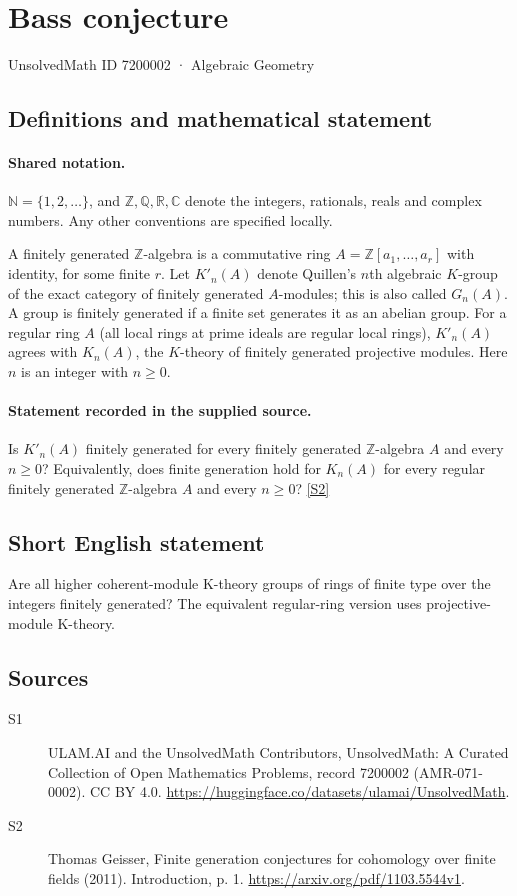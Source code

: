 \documentclass[11pt]{article}
\newcommand{\sref}[2]{\hyperlink{source:#1:#2}{[S#2]}}
\begin{document}
\setcounter{section}{7200001}
\section{Bass conjecture}\label{7200002}
{\small\sffamily UnsolvedMath ID 7200002 · Algebraic Geometry}
\subsection{Definitions and mathematical statement}

\paragraph{Shared notation.}$\mathbb N=\{1,2,\ldots\}$, and $\mathbb Z,\mathbb Q,\mathbb R,\mathbb C$ denote the integers, rationals, reals and complex numbers. Any other conventions are specified locally.


A finitely generated $\mathbb Z$-algebra is a commutative ring $A=\mathbb Z[a_1,\ldots,a_r]$ with identity, for some finite $r$. Let $K'_n(A)$ denote Quillen's $n$th algebraic $K$-group of the exact category of finitely generated $A$-modules; this is also called $G_n(A)$. A group is finitely generated if a finite set generates it as an abelian group. For a regular ring $A$ (all local rings at prime ideals are regular local rings), $K'_n(A)$ agrees with $K_n(A)$, the $K$-theory of finitely generated projective modules. Here $n$ is an integer with $n\geq0$.
\paragraph{Statement recorded in the supplied source.}
Is $K'_n(A)$ finitely generated for every finitely generated $\mathbb Z$-algebra $A$ and every $n\geq0$? Equivalently, does finite generation hold for $K_n(A)$ for every regular finitely generated $\mathbb Z$-algebra $A$ and every $n\geq0$? \sref{7200002}{2}
\subsection{Short English statement}
Are all higher coherent-module K-theory groups of rings of finite type over the integers finitely generated? The equivalent regular-ring version uses projective-module K-theory.
\subsection{Sources}
\begin{description}
\item[\hypertarget{source:7200002:1}{S1}] ULAM.AI and the UnsolvedMath Contributors, UnsolvedMath: A Curated Collection of Open Mathematics Problems, record 7200002 (AMR-071-0002). CC BY 4.0. \url{https://huggingface.co/datasets/ulamai/UnsolvedMath}.
\item[\hypertarget{source:7200002:2}{S2}] Thomas Geisser, Finite generation conjectures for cohomology over finite fields (2011). Introduction, p. 1. \url{https://arxiv.org/pdf/1103.5544v1}.
\end{description}
\label{end:7200002}
\end{document}
